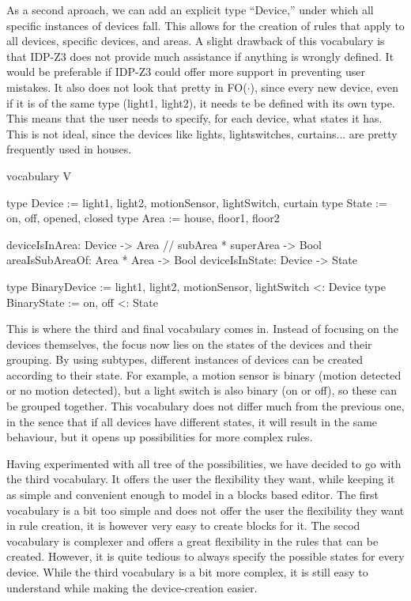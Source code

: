 \documentclass[11pt,a4paper]{report}
\newcommand{\fodot}{FO($\cdot$)\xspace}
\begin{document}
As a second aproach, we can add an explicit type ``Device,'' under which all specific instances of devices fall. This allows for the creation of rules that apply to all devices, specific devices, and areas. A slight drawback of this vocabulary is that IDP-Z3 does not provide much assistance if anything is wrongly defined. It would be preferable if IDP-Z3 could offer more support in preventing user mistakes. It also does not look that pretty in \fodot, since every new device, even if it is of the same type (light1, light2), it needs te be defined with its own type. This means that the user needs to specify, for each device, what states it has. This is not ideal, since the devices like lights, lightswitches, curtains... are pretty frequently used in houses.

\begin{idplisting}
vocabulary V {
    type Device := {light1, light2, motionSensor, lightSwitch, curtain}
    type State := {on, off, opened, closed}
    type Area := {house, floor1, floor2}

    deviceIsInArea: Device -> Area
    // subArea * superArea -> Bool
    areaIsSubAreaOf: Area * Area -> Bool
    deviceIsInState: Device -> State

    type BinaryDevice := {light1, light2, motionSensor, lightSwitch} <: Device
    type BinaryState := {on, off} <: State
}
\end{idplisting}

This is where the third and final vocabulary comes in. Instead of focusing on the devices themselves, the focus now lies on the states of the devices and their grouping. By using subtypes, different instances of devices can be created according to their state. For example, a motion sensor is binary (motion detected or no motion detected), but a light switch is also binary (on or off), so these can be grouped together. This vocabulary does not differ much from the previous one, in the sence that if all devices have different states, it will result in the same behaviour, but it opens up possibilities for more complex rules. 

Having experimented with all tree of the possibilities, we have decided to go with the third vocabulary. It offers the user the flexibility they want, while keeping it as simple and convenient enough to model in a blocks based editor. The first vocabulary is a bit too simple and does not offer the user the flexibility they want in rule creation, it is however very easy to create blocks for it. The secod vocabulary is complexer and offers a great flexibility in the rules that can be created. However, it is quite tedious to always specify the possible states for every device. While the third vocabulary is a bit more complex, it is still easy to understand while making the device-creation easier.
\end{document}
